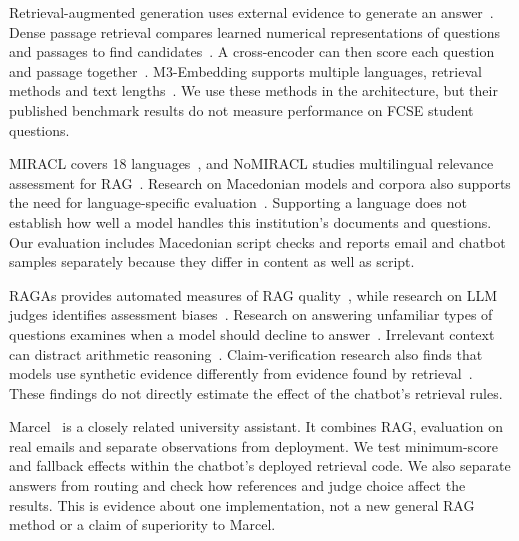 Retrieval-augmented generation uses external evidence to generate an answer~\cite{lewis2020rag}. Dense passage retrieval compares learned numerical representations of questions and passages to find candidates~\cite{karpukhin2020dpr}. A cross-encoder can then score each question and passage together~\cite{nogueira2019bertrerank}. M3-Embedding supports multiple languages, retrieval methods and text lengths~\cite{chen2024m3}. We use these methods in the architecture, but their published benchmark results do not measure performance on FCSE student questions.

MIRACL covers 18 languages~\cite{zhang2023miracl}, and NoMIRACL studies multilingual relevance assessment for RAG~\cite{thakur2024nomiracl}. Research on Macedonian models and corpora also supports the need for language-specific evaluation~\cite{krsteski2025macedonian}. Supporting a language does not establish how well a model handles this institution's documents and questions. Our evaluation includes Macedonian script checks and reports email and chatbot samples separately because they differ in content as well as script.

RAGAs provides automated measures of RAG quality~\cite{es2024ragas}, while research on LLM judges identifies assessment biases~\cite{zheng2023judge}. Research on answering unfamiliar types of questions examines when a model should decline to answer~\cite{kamath2020selective}. Irrelevant context can distract arithmetic reasoning~\cite{shi2023distracted}. Claim-verification research also finds that models use synthetic evidence differently from evidence found by retrieval~\cite{hagstrom2025reality}. These findings do not directly estimate the effect of the chatbot's retrieval rules.

Marcel~\cite{trienes2025marcel} is a closely related university assistant. It combines RAG, evaluation on real emails and separate observations from deployment. We test minimum-score and fallback effects within the chatbot's deployed retrieval code. We also separate answers from routing and check how references and judge choice affect the results. This is evidence about one implementation, not a new general RAG method or a claim of superiority to Marcel.
